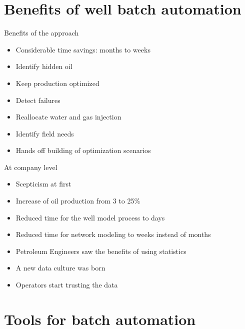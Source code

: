 \documentclass[14pt,ignorenonframetext,]{beamer}
\providecommand{\tightlist}{%
  \setlength{\itemsep}{0pt}\setlength{\parskip}{0pt}}
\begin{document}
\hypertarget{benefits-of-well-batch-automation}{%
\section{Benefits of well batch
automation}\label{benefits-of-well-batch-automation}}

\begin{frame}{Benefits of the approach}
\protect\hypertarget{benefits-of-the-approach}{}

\begin{itemize}
\tightlist
\item
  Considerable time savings: months to weeks
\item
  Identify hidden oil
\item
  Keep production optimized
\item
  Detect failures
\item
  Reallocate water and gas injection
\item
  Identify field needs
\item
  Hands off building of optimization scenarios
\end{itemize}

\end{frame}

\begin{frame}{At company level}
\protect\hypertarget{at-company-level}{}

\fontsize{13}{15}\sf

\begin{itemize}
\tightlist
\item
  Scepticism at first
\item
  Increase of oil production from 3 to 25\%
\item
  Reduced time for the well model process to days
\item
  Reduced time for network modeling to weeks instead of months
\item
  Petroleum Engineers saw the benefits of using statistics
\item
  A new data culture was born
\item
  Operators start trusting the data
\end{itemize}

\end{frame}

\hypertarget{tools-for-batch-automation}{%
\section{Tools for batch automation}\label{tools-for-batch-automation}}
\end{document}
